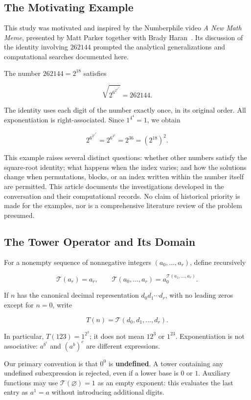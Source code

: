 \documentclass[11pt,a4paper]{article}
\begin{document}
\subsection{The Motivating Example}

This study was motivated and inspired by the Numberphile video \emph{A New Math Meme}, presented by Matt Parker together with Brady Haran~\cite{numberphile-meme}. Its discussion of the identity involving $262144$ prompted the analytical generalizations and computational searches documented here.

The number $262144=2^{18}$ satisfies

\[
\sqrt{2^{6^{2^{1^{4^4}}}}}=262144.
\]

The identity uses each digit of the number exactly once, in its original order. All exponentiation is right-associated. Since $1^{4^4}=1$, we obtain

\[
2^{6^{2^{1^{4^4}}}}=2^{6^{2^1}}=2^{36}=(2^{18})^2.
\]

This example raises several distinct questions: whether other numbers satisfy the square-root identity; what happens when the index varies; and how the solutions change when permutations, blocks, or an index written within the number itself are permitted. This article documents the investigations developed in the conversation and their computational records. No claim of historical priority is made for the examples, nor is a comprehensive literature review of the problem presumed.

\subsection{The Tower Operator and Its Domain}

For a nonempty sequence of nonnegative integers $(a_0,\ldots,a_r)$, define recursively

\[
\mathcal T(a_r)=a_r,\qquad
\mathcal T(a_0,\ldots,a_r)
=a_0^{\mathcal T(a_1,\ldots,a_r)}.
\]

If $n$ has the canonical decimal representation $d_0d_1\cdots d_r$, with no leading zeros except for $n=0$, write

\[
T(n)=\mathcal T(d_0,d_1,\ldots,d_r).
\]

In particular, $T(123)=1^{2^3}$; it does not mean $12^3$ or $1^{23}$. Exponentiation is not associative: $a^{b^c}$ and $(a^b)^c$ are different expressions.

Our primary convention is that $0^0$ is \textbf{undefined}. A tower containing any undefined subexpression is rejected, even if a lower base is $0$ or $1$. Auxiliary functions may use $\mathcal T(\varnothing)=1$ as an empty exponent: this evaluates the last entry as $a^1=a$ without introducing additional digits.
\end{document}
